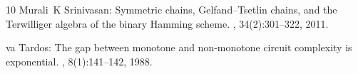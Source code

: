 \documentclass[11pt]{article}
\numberwithin{equation}{section}
\theoremstyle{definition}
\theoremstyle{plain}
\begin{document}
\begin{thebibliography}{10}
{\sc Murali~K Srinivasan}: {Symmetric chains, Gelfand--Tsetlin chains, and the
  Terwilliger algebra of the binary Hamming scheme}.
, 34(2):301--322, 2011.
\newblock [\epfmtdoi{10.1007/s10801-010-0272-2}]

{va Tardos}: The gap between monotone and non-monotone circuit
  complexity is exponential.
, 8(1):141--142, 1988.
\newblock [\epfmtdoi{10.1007/BF02122563}]

\end{thebibliography}
\end{document}
